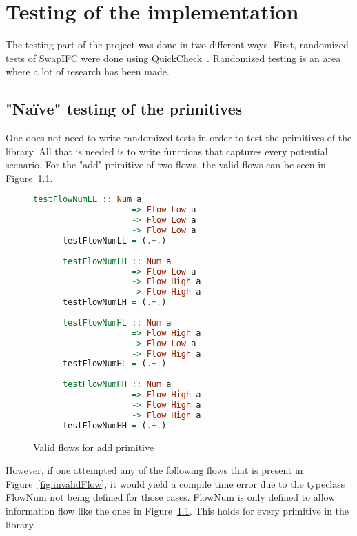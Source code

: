 \chapter{Testing of the implementation}
The testing part of the project was done in two different ways. First, randomized tests of SwapIFC were done using QuickCheck~\cite{quickcheck, quickcheck-wiki}. Randomized testing is an area where a lot of research has been made.
\section{"Naïve" testing of the primitives}
One does not need to write randomized tests in order to test the primitives of the library. All that is needed is to write functions that captures every potential scenario. For the "add" primitive of two flows, the valid flows can be seen in Figure~\ref{fig:validFlow}.
\begin{figure}[h]
  \begin{center}
    \begin{lstlisting}[language=Haskell]
      testFlowNumLL :: Num a
                    => Flow Low a
                    -> Flow Low a
                    -> Flow Low a
      testFlowNumLL = (.+.)
    
      testFlowNumLH :: Num a
                    => Flow Low a
                    -> Flow High a
                    -> Flow High a
      testFlowNumLH = (.+.)
    
      testFlowNumHL :: Num a
                    => Flow High a
                    -> Flow Low a
                    -> Flow High a
      testFlowNumHL = (.+.)
    
      testFlowNumHH :: Num a
                    => Flow High a
                    -> Flow High a
                    -> Flow High a
      testFlowNumHH = (.+.)
    \end{lstlisting}
  \end{center}
  \caption{Valid flows for add primitive}
  \label{fig:validFlow}
\end{figure}
However, if one attempted any of the following flows that is present in Figure~\ref{fig:invalidFlow}, it would yield a compile time error due to the typeclass FlowNum not being defined for those cases. FlowNum is only defined to allow information flow like the ones in Figure~\ref{fig:validFlow}. This holds for every primitive in the library.
